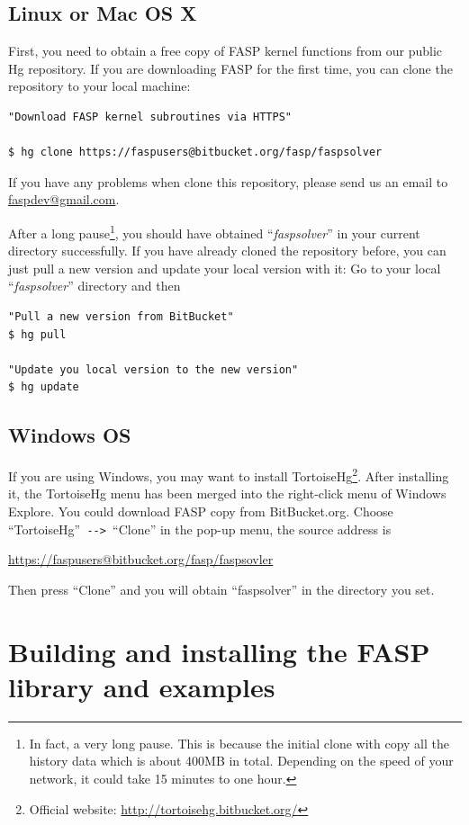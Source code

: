 \documentclass[11pt]{memoir}
\begin{document}
\subsection{Linux or Mac OS X}
First, you need to obtain a free copy of FASP kernel functions from
our public Hg repository. If you are downloading FASP for the first
time, you can clone the repository to your local machine:
%
\begin{lstlisting}[numbers=none]
"Download FASP kernel subroutines via HTTPS"

$ hg clone https://faspusers@bitbucket.org/fasp/faspsolver
\end{lstlisting}
%
\begin{snugshade}\noindent
If you have any problems when clone this repository, please send us an email to \url{faspdev@gmail.com}.
\end{snugshade}

After a long pause\footnote{In fact, a very long pause. This is
  because the initial clone with copy all the history data which is
  about 400MB in total. Depending on the speed of your network, it
  could take 15 minutes to one hour.}, you should have obtained
``\emph{faspsolver}'' in your current directory successfully. If you
have already cloned the repository before, you can just pull a new
version and update your local version with it: Go to your local
``\emph{faspsolver}'' directory and then
%
\begin{lstlisting}[numbers=none]
"Pull a new version from BitBucket"
$ hg pull

"Update you local version to the new version"
$ hg update
\end{lstlisting}
%

\subsection{Windows OS}
If you are using Windows, you may want to install
TortoiseHg\footnote{Official website:
  \url{http://tortoisehg.bitbucket.org/}}. After installing it, the
TortoiseHg menu has been merged into the right-click menu of Windows
Explore. You could download FASP copy from BitBucket.org. Choose
``TortoiseHg''\verb| --> |``Clone'' in the pop-up menu, the source
address is
\begin{center}
\url{https://faspusers@bitbucket.org/fasp/faspsovler}
\end{center}
Then press ``Clone'' and you will obtain ``faspsolver'' in the directory you set.


\section{Building and installing the FASP library and examples}\label{sec:build}
\end{document}
